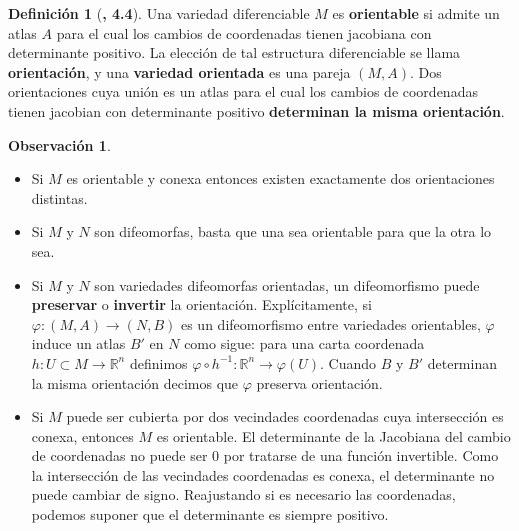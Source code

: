 \documentclass[spanish]{book}
\theoremstyle{definition}
\newtheorem*{defn}{Definición}
\newtheorem*{obs}{Observación}
\newcommand{\R}{\mathbb{R}}
\begin{document}
	\begin{defn}[\cite{DoCarmo}\textbf{, 4.4}]
		Una variedad diferenciable $M$ es \textbf{orientable} si admite un atlas $A$ para el cual los cambios de coordenadas tienen jacobiana con determinante positivo. La elección de tal estructura diferenciable se llama \textbf{orientación}, y una \textbf{variedad orientada} es una pareja $(M,A)$. Dos orientaciones cuya unión es un atlas para el cual los cambios de coordenadas tienen jacobian con determinante positivo \textbf{determinan la misma orientación}.
	\end{defn}
	\begin{obs}\leavevmode
		\begin{itemize}
			\item Si $M$ es orientable y conexa entonces existen exactamente dos orientaciones distintas.
			\item Si $M$ y $N$ son difeomorfas, basta que una sea orientable para que la otra lo sea.
			\item Si $M$ y $N$ son variedades difeomorfas orientadas, un difeomorfismo puede \textbf{preservar} o \textbf{invertir} la orientación. Explícitamente, si $\varphi:(M,A)\to (N,B)$ es un difeomorfismo entre variedades orientables, $\varphi$ induce un atlas $B'$ en $N$ como sigue: para una carta coordenada $h:U\subset M\to\R^n$ definimos $\varphi\circ h^{-1}:\R^n\to \varphi(U)$. Cuando $B$ y $B'$ determinan la misma orientación decimos que $\varphi$ preserva orientación.
			\item Si $M$ puede ser cubierta por dos vecindades coordenadas cuya intersección es conexa, entonces $M$ es orientable. El determinante de la Jacobiana del cambio de coordenadas no puede ser 0 por tratarse de una función invertible. Como la intersección de las vecindades coordenadas es conexa, el determinante no puede cambiar de signo. Reajustando si es necesario las coordenadas, podemos suponer que el determinante es siempre positivo.
		\end{itemize}
	\end{obs}
\end{document}
